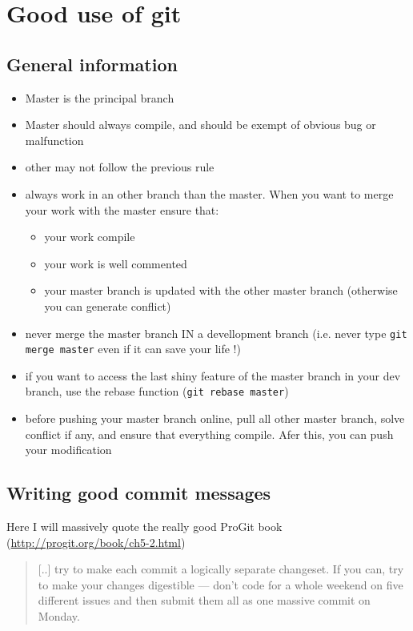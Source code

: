 \chapter{Good use of git}

\section{General information}

\begin{itemize}
  \item Master is the principal branch
  \item Master should always compile, and should be exempt of obvious bug or malfunction
  \item other may not follow the previous rule
  \item  always work in an other branch than the master. When you want to merge your work with the master ensure that:
	 \begin{itemize}
		\item your work compile
		\item your work is well commented
		\item your master branch is updated with the other master branch (otherwise you can generate conflict)
	 \end{itemize}
  \item  never merge the master branch IN a devellopment branch (i.e. never type \verb+git merge master+ even if it can save your life !)
  \item  if you want to access the last shiny feature of the master branch in your dev branch, use the rebase function (\verb+git rebase master+)
  \item  before pushing your master branch online, pull all other master branch, solve conflict if any, and ensure that everything compile. Afer this, you can push your modification
\end{itemize}

\section{Writing good commit messages}

Here I will massively quote the really good ProGit book (\url{http://progit.org/book/ch5-2.html})

\begin{quote}
  [..] try to make each commit a logically separate changeset. If you can, try to make your changes digestible — don’t code for a whole weekend on five different issues and then submit them all as one massive commit on Monday.
\end{quote}

